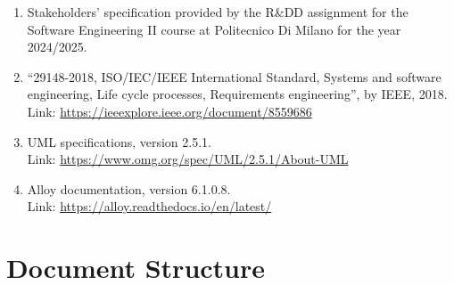 \begin{enumerate}
    \item Stakeholders’ specification provided by the R\&DD assignment for the Software Engineering II course at Politecnico Di Milano for the year 2024/2025.
    \item ``29148-2018, ISO/IEC/IEEE International Standard, Systems and software engineering, Life cycle processes, Requirements engineering'', by IEEE, 2018. \\
    Link: \url{https://ieeexplore.ieee.org/document/8559686}
    \item UML specifications, version 2.5.1. \\
    Link: \url{https://www.omg.org/spec/UML/2.5.1/About-UML}
    \item Alloy documentation, version 6.1.0.8. \\
    Link: \url{https://alloy.readthedocs.io/en/latest/}
\end{enumerate}

\newpage
\section{Document Structure}